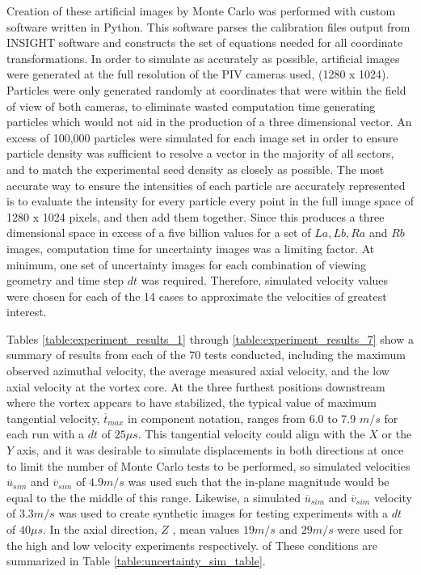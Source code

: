 Creation of these artificial images by Monte Carlo was performed with custom 
software written in Python. This software parses the calibration files output 
from INSIGHT software and constructs the set of equations needed for all 
coordinate transformations. In order to simulate as accurately as possible, 
artificial images were generated at the full resolution of the PIV cameras 
used, (1280 x 1024). Particles were only generated randomly at coordinates 
that were within the field of view of both cameras, to eliminate wasted 
computation time generating particles which would not aid in the production of 
a three dimensional vector. An excess of 100,000 particles were simulated for 
each image set in order to ensure particle density was sufficient to resolve a 
vector in the majority of all sectors, and to match the experimental seed 
density as closely as possible. The most accurate way to ensure the intensities 
of each particle are accurately represented is to evaluate the intensity for 
every particle every point in the full image space of 1280 x 1024 pixels, and 
then add them together. Since this produces a three dimensional space in excess 
of a five billion values for a set of $La, Lb, Ra$ and $Rb$ images, computation 
time for uncertainty images was a limiting factor. At minimum, one set of 
uncertainty images for each combination of viewing geometry and time step $dt$ 
was required. Therefore, simulated velocity values were chosen for each of the 
14 cases to approximate the velocities of greatest interest. 

Tables \ref{table:experiment_results_1} through 
\ref{table:experiment_results_7} show a summary of results from each of the 70 
tests conducted, including the maximum 
observed azimuthal velocity, the average measured axial velocity, and the low 
axial velocity at the vortex core. At the three furthest positions downstream 
where the vortex appears to have stabilized, the typical value of maximum 
tangential velocity, $\overline{t}_{max}$ in component notation, ranges from 
6.0 to 7.9 $m/s$ for each run with a $dt$ of $25 \mu s$. This tangential 
velocity could align with the $X$ or the $Y$ axis, and 
it was desirable to simulate displacements in both directions at once to limit 
the number of Monte Carlo tests to be performed, so simulated velocities
$\overline{u}_{sim}$ and $\overline{v}_{sim}$
of $4.9 m/s$ was used such that the in-plane magnitude would be equal 
to the the middle of this range. Likewise, a simulated $\overline{u}_{sim}$ and 
$\overline{v}_{sim}$  velocity of 
$3.3 m/s$ was used to create synthetic images for testing experiments with a 
$dt$ of $40 \mu s$. In the axial direction, $Z$ , mean values $19 m/s$ and $29 
m/s$ were used for the high and low velocity experiments respectively. of These 
conditions are summarized in Table \ref{table:uncertainty_sim_table}.

